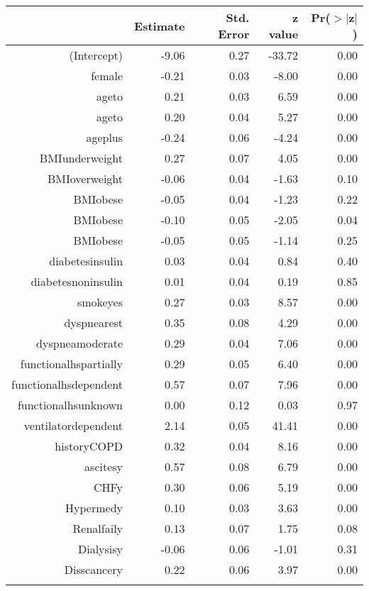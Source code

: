 \bigskip\bigskip
\centering
\begin{tabular}{rrrrr}
  \hline
 & Estimate & Std. Error & z value & Pr($>$$|$z$|$) \\ 
  \hline
(Intercept) & -9.06 & 0.27 & -33.72 & 0.00 \\ 
  female & -0.21 & 0.03 & -8.00 & 0.00 \\ 
  age\-65\-to\-74 & 0.21 & 0.03 & 6.59 & 0.00 \\ 
  age\-75\-to\-84 & 0.20 & 0.04 & 5.27 & 0.00 \\ 
  age\-85\-plus & -0.24 & 0.06 & -4.24 & 0.00 \\ 
  BMI\-underweight & 0.27 & 0.07 & 4.05 & 0.00 \\ 
  BMI\-overweight & -0.06 & 0.04 & -1.63 & 0.10 \\ 
  BMI\-obese\-1 & -0.05 & 0.04 & -1.23 & 0.22 \\ 
  BMI\-obese\-2 & -0.10 & 0.05 & -2.05 & 0.04 \\ 
  BMI\-obese\-3 & -0.05 & 0.05 & -1.14 & 0.25 \\ 
  diabetes\-insulin & 0.03 & 0.04 & 0.84 & 0.40 \\ 
  diabetes\-noninsulin & 0.01 & 0.04 & 0.19 & 0.85 \\ 
  smoke\-yes & 0.27 & 0.03 & 8.57 & 0.00 \\ 
  dyspnea\-rest & 0.35 & 0.08 & 4.29 & 0.00 \\ 
  dyspnea\-moderate & 0.29 & 0.04 & 7.06 & 0.00 \\ 
  functional\-hs\-partially & 0.29 & 0.05 & 6.40 & 0.00 \\ 
  functional\-hs\-dependent & 0.57 & 0.07 & 7.96 & 0.00 \\ 
  functional\-hs\-unknown & 0.00 & 0.12 & 0.03 & 0.97 \\ 
  ventilator\-dependent & 2.14 & 0.05 & 41.41 & 0.00 \\ 
  history\-COPD & 0.32 & 0.04 & 8.16 & 0.00 \\ 
  ascites\-y & 0.57 & 0.08 & 6.79 & 0.00 \\ 
  CHF\-y & 0.30 & 0.06 & 5.19 & 0.00 \\ 
  Hyper\-med\-y & 0.10 & 0.03 & 3.63 & 0.00 \\ 
  Renal\-fail\-y & 0.13 & 0.07 & 1.75 & 0.08 \\ 
  Dialysis\-y & -0.06 & 0.06 & -1.01 & 0.31 \\ 
  Diss\-cancer\-y & 0.22 & 0.06 & 3.97 & 0.00 \\ 
$$
\end{tabular}
